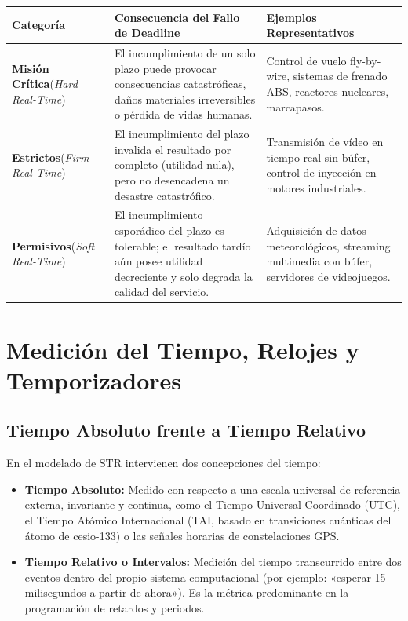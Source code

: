 \begin{table}[h!]
\centering
\small
\begin{tabular}{p{3cm}p{5.5cm}p{5.5cm}}
\toprule
\textbf{Categoría} & \textbf{Consecuencia del Fallo de Deadline} & \textbf{Ejemplos Representativos} \\
\midrule
\textbf{Misión Crítica}\newline (\textit{Hard Real-Time}) & El incumplimiento de un solo plazo puede provocar consecuencias catastróficas, daños materiales irreversibles o pérdida de vidas humanas. & Control de vuelo fly-by-wire, sistemas de frenado ABS, reactores nucleares, marcapasos. \\
\addlinespace
\textbf{Estrictos}\newline (\textit{Firm Real-Time}) & El incumplimiento del plazo invalida el resultado por completo (utilidad nula), pero no desencadena un desastre catastrófico. & Transmisión de vídeo en tiempo real sin búfer, control de inyección en motores industriales. \\
\addlinespace
\textbf{Permisivos}\newline (\textit{Soft Real-Time}) & El incumplimiento esporádico del plazo es tolerable; el resultado tardío aún posee utilidad decreciente y solo degrada la calidad del servicio. & Adquisición de datos meteorológicos, streaming multimedia con búfer, servidores de videojuegos. \\
\bottomrule
\end{tabular}
\end{table}

\section{Medición del Tiempo, Relojes y Temporizadores}

\subsection{Tiempo Absoluto frente a Tiempo Relativo}
En el modelado de STR intervienen dos concepciones del tiempo:
\begin{itemize}[leftmargin=*]
    \item \textbf{Tiempo Absoluto:} Medido con respecto a una escala universal de referencia externa, invariante y continua, como el Tiempo Universal Coordinado (UTC), el Tiempo Atómico Internacional (TAI, basado en transiciones cuánticas del átomo de cesio-133) o las señales horarias de constelaciones GPS.
    \item \textbf{Tiempo Relativo o Intervalos:} Medición del tiempo transcurrido entre dos eventos dentro del propio sistema computacional (por ejemplo: «esperar 15 milisegundos a partir de ahora»). Es la métrica predominante en la programación de retardos y periodos.
\end{itemize}

